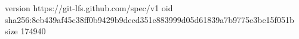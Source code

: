 version https://git-lfs.github.com/spec/v1
oid sha256:8eb439af45c38ff0b9429b9decd351e883999d05d61839a7b9775e3be15f051b
size 174940
